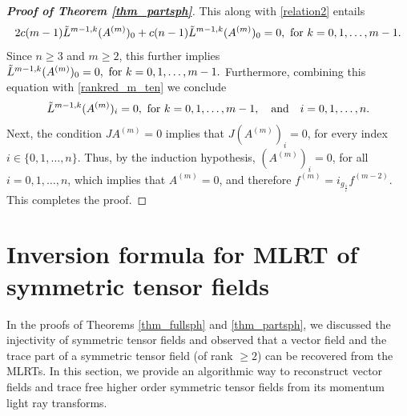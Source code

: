 \documentclass[11pt,a4paper,reqno]{amsart}
\newcommand{\qum}[1]{\quad\mbox{#1}}
\begin{document}
\begin{proof}[\textbf{Proof of Theorem \ref{thm_partsph}}]
	This along with   \eqref{relation2} entails
		\begin{equation*}
			2c(m-1)\Tilde{L}^{m-1,k}(A^{(m)})_0 + c(n-1)\Tilde{L}^{m-1,k}(A^{(m)})_0 =0, \text{ for } k=0,1,\dots,m-1.
		\end{equation*}
	Since $n\geq 3$ and $m\geq 2$,  this further implies $ 	\Tilde{L}^{m-1,k}(A^{(m)})_0=0, \text{ for }k=0,1,\dots,m-1.$ 
	Furthermore, combining this equation with \eqref{rankred_m_ten} we conclude
		\begin{equation}
			\Tilde{L}^{m-1,k}(A^{(m)})_i=0, \text{ for }k=0,1,\dots,m-1, \qum{and}\quad  i=0,1,\dots,n.
		\end{equation}
		Next, the condition  $JA^{(m
			)}=0$ implies that \(J(A^{(m)})_i = 0 \), for every index \( i \in \{0, 1, \ldots, n\} \). Thus, by the induction hypothesis, \( (A^{(m)})_i = 0 \), for all \( i = 0, 1, \ldots, n \), which implies that \( A^{(m)} = 0 \), and therefore $f^{(m)}=i_{g_{\frac{1}{c}}}f^{(m-2)}$.
			This completes the proof.
	\end{proof}
	\section{Inversion formula for MLRT of symmetric tensor fields}\label{sec6}
    In the proofs of Theorems  \ref{thm_fullsph} and \ref{thm_partsph}, we discussed the injectivity of symmetric tensor fields and observed that a vector field and the trace part of a symmetric tensor field (of rank $\ge 2$) can  be recovered from the MLRTs.  In this section, we provide an algorithmic way to reconstruct vector fields and trace free higher order symmetric tensor fields from its momentum light ray transforms. 
\end{document}
